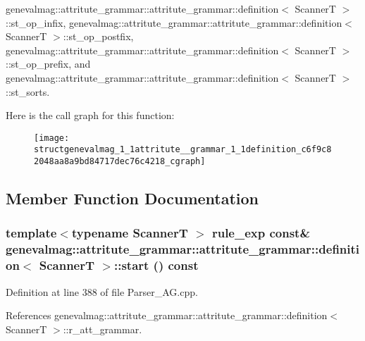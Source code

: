 genevalmag::attritute\_\-grammar::attritute\_\-grammar::definition$<$ ScannerT $>$::st\_\-op\_\-infix, genevalmag::attritute\_\-grammar::attritute\_\-grammar::definition$<$ ScannerT $>$::st\_\-op\_\-postfix, genevalmag::attritute\_\-grammar::attritute\_\-grammar::definition$<$ ScannerT $>$::st\_\-op\_\-prefix, and genevalmag::attritute\_\-grammar::attritute\_\-grammar::definition$<$ ScannerT $>$::st\_\-sorts.

Here is the call graph for this function:\nopagebreak
\begin{figure}[H]
\begin{center}
\leavevmode
\texttt{[image: structgenevalmag\_1\_1attritute\_\_grammar\_1\_1definition\_c6f9c82048aa8a9bd84717dec76c4218\_cgraph]}
\end{center}
\end{figure}


\subsection{Member Function Documentation}
\hypertarget{structgenevalmag_1_1attritute__grammar_1_1definition_31009c1b0ad8c9520713481c070b82c9}{
\subsubsection[{start}]{\setlength{\rightskip}{0pt plus 5cm}template$<$typename ScannerT $>$ {\bf rule\_\-exp} const\& genevalmag::attritute\_\-grammar::attritute\_\-grammar::definition$<$ ScannerT $>$::start () const}}
\label{structgenevalmag_1_1attritute__grammar_1_1definition_31009c1b0ad8c9520713481c070b82c9}




Definition at line 388 of file Parser\_\-AG.cpp.

References genevalmag::attritute\_\-grammar::attritute\_\-grammar::definition$<$ ScannerT $>$::r\_\-att\_\-grammar.

